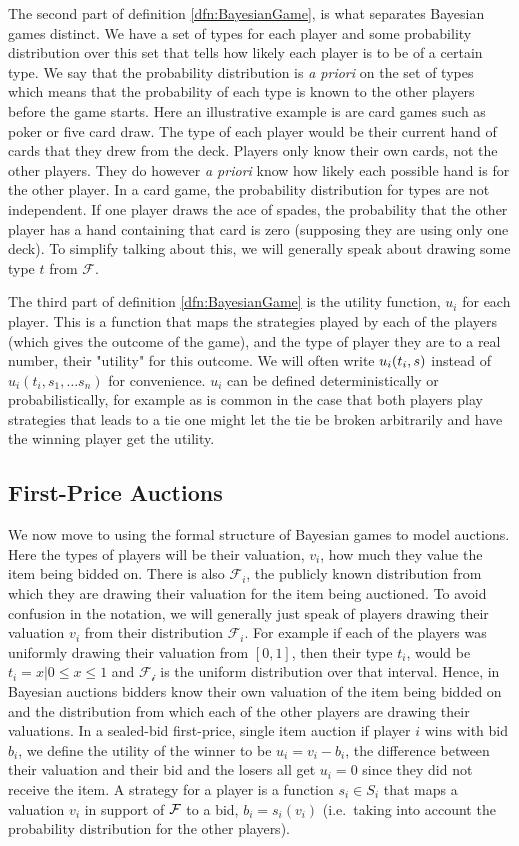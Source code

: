 \documentclass[12pt,twoside]{reedthesis}
\begin{document}
The second part of definition \ref{dfn:BayesianGame}, is what separates Bayesian games distinct. We have a set of types for each player and some probability distribution over this set that tells how likely each player is to be of a certain type. We say that the probability distribution is {\em a priori} on the set of types which means that the probability of each type is known to the other players before the game starts. Here an illustrative example is are card games such as poker or five card draw. The type of each player would be their current hand of cards that they drew from the deck. Players only know their own cards, not the other players. They do however {\em a priori} know how likely each possible hand is for the other player. In a card game, the probability distribution for types are not independent. If one player draws the ace of spades, the probability that the other player has a hand containing that card is zero (supposing they are using only one deck). To simplify talking about this, we will generally speak about drawing some type $t$ from $\mathcal{F}$.

The third part of definition \ref{dfn:BayesianGame} is the utility function, $u_i$ for each player. This is a function that maps the strategies played by each of the players (which gives the outcome of the game), and the type of player they are to a real number, their "utility" for this outcome. We will often write $u_i(t_i, \boldmath{s})$ instead of $u_i(t_i, s_1, \ldots s_n)$ for convenience. $u_i$ can be defined deterministically or probabilistically, for example as is common in the case that both players play strategies that leads to a tie one might let the tie be broken arbitrarily and have the winning player get the utility.


\subsection{First-Price Auctions}
We now move to using the formal structure of Bayesian games to model auctions. Here the types of players will be their valuation, $v_i$, how much they value the item being bidded on. There is also $\mathcal{F}_i$, the publicly known distribution from which they are drawing their valuation for the item being auctioned. To avoid confusion in the notation, we will generally just speak of players drawing their valuation $v_i$ from their distribution $\mathcal{F}_i$. For example if each of the players was uniformly drawing their valuation from $[0,1]$, then their type $t_i$, would be $t_i = {x | 0 \leq x \leq 1}$ and $\mathcal{F_i}$ is the uniform distribution over that interval. Hence, in Bayesian auctions bidders know their own valuation of the item being bidded on and the distribution from which each of the other players are drawing their valuations. In a sealed-bid first-price, single item auction if player $i$ wins with bid $b_i$, we define the utility of the winner to be $u_i = v_i - b_i$, the difference between their valuation and their bid and the losers all get $u_i = 0$ since they did not receive the item. A strategy for a player is a function $s_i \in S_i$ that maps a valuation $v_i$ in support of $\mathcal{F}$ to a bid, $b_i = s_i(v_i)$ (i.e.~taking into account the probability distribution for the other players). 
\end{document}
